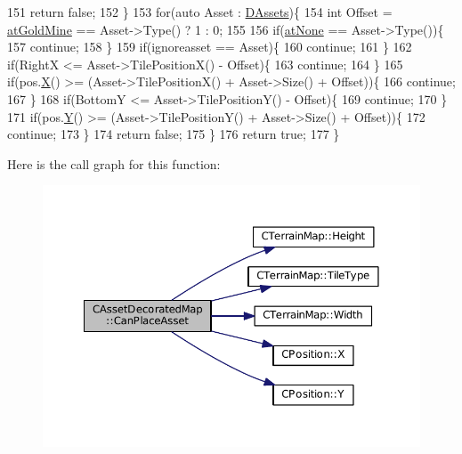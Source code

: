 \begin{DoxyCode}
151         \textcolor{keywordflow}{return} \textcolor{keyword}{false};   
152     \}
153     \textcolor{keywordflow}{for}(\textcolor{keyword}{auto} Asset : \hyperlink{classCAssetDecoratedMap_a94eeed5b16141169b1ba6cb3842055aa}{DAssets})\{
154         \textcolor{keywordtype}{int} Offset = \hyperlink{GameDataTypes_8h_a5600d4fc433b83300308921974477feca243d9ba44092eadd561db058d742b3b3}{atGoldMine} == Asset->Type() ? 1 : 0;
155 
156         \textcolor{keywordflow}{if}(\hyperlink{GameDataTypes_8h_a5600d4fc433b83300308921974477feca82fb51718e2c00981a2d37bc6fe92593}{atNone} == Asset->Type())\{
157             \textcolor{keywordflow}{continue};    
158         \}
159         \textcolor{keywordflow}{if}(ignoreasset == Asset)\{
160             \textcolor{keywordflow}{continue};   
161         \}
162         \textcolor{keywordflow}{if}(RightX <= Asset->TilePositionX() - Offset)\{
163             \textcolor{keywordflow}{continue};   
164         \}
165         \textcolor{keywordflow}{if}(pos.\hyperlink{classCPosition_a9a6b94d3b91df1492d166d9964c865fc}{X}() >= (Asset->TilePositionX() + Asset->Size() + Offset))\{
166             \textcolor{keywordflow}{continue};   
167         \}
168         \textcolor{keywordflow}{if}(BottomY <= Asset->TilePositionY() - Offset)\{
169             \textcolor{keywordflow}{continue};   
170         \}
171         \textcolor{keywordflow}{if}(pos.\hyperlink{classCPosition_a1aa8a30e2f08dda1f797736ba8c13a87}{Y}() >= (Asset->TilePositionY() + Asset->Size() + Offset))\{
172             \textcolor{keywordflow}{continue};   
173         \}
174         \textcolor{keywordflow}{return} \textcolor{keyword}{false};
175     \}
176     \textcolor{keywordflow}{return} \textcolor{keyword}{true};
177 \}
\end{DoxyCode}
Here is the call graph for this function\+:\nopagebreak
\begin{figure}[H]
\begin{center}
\leavevmode
\includegraphics[width=350pt]{classCAssetDecoratedMap_ad4baef4b84b066847459e45205c8575c_cgraph}
\end{center}
\end{figure}
